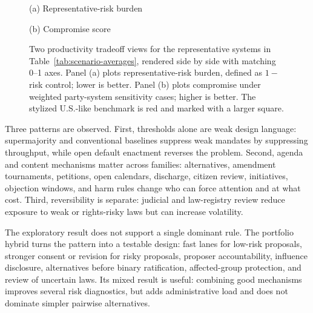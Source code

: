 \documentclass[manuscript,review,anonymous]{acmart}
\begin{document}
\begin{figure}[!htbp]
  \centering
  \begin{minipage}[t]{0.49\textwidth}
    \centering
    \resizebox{\linewidth}{!}{}
    \vspace{-0.75\baselineskip}
    \centerline{\small (a) Representative-risk burden}
  \end{minipage}\hfill
  \begin{minipage}[t]{0.49\textwidth}
    \centering
    \resizebox{\linewidth}{!}{}
    \vspace{-0.75\baselineskip}
    \centerline{\small (b) Compromise score}
  \end{minipage}
  \caption{Two productivity tradeoff views for the representative systems in Table~\ref{tab:scenario-averages}, rendered side by side with matching 0--1 axes. Panel (a) plots representative-risk burden, defined as \(1-\)risk control; lower is better. Panel (b) plots compromise under weighted party-system sensitivity cases; higher is better. The stylized U.S.-like benchmark is red and marked with a larger square.}
  \label{fig:productivity-risk-burden}
  \label{fig:compromise-productivity}
\end{figure}

Three patterns are observed. First, thresholds alone are weak design language: supermajority and conventional baselines suppress weak mandates by suppressing throughput, while open default enactment reverses the problem. Second, agenda and content mechanisms matter across families: alternatives, amendment tournaments, petitions, open calendars, discharge, citizen review, initiatives, objection windows, and harm rules change who can force attention and at what cost. Third, reversibility is separate: judicial and law-registry review reduce exposure to weak or rights-risky laws but can increase volatility.

The exploratory result does not support a single dominant rule. The portfolio hybrid turns the pattern into a testable design: fast lanes for low-risk proposals, stronger consent or revision for risky proposals, proposer accountability, influence disclosure, alternatives before binary ratification, affected-group protection, and review of uncertain laws. Its mixed result is useful: combining good mechanisms improves several risk diagnostics, but adds administrative load and does not dominate simpler pairwise alternatives.
\end{document}
